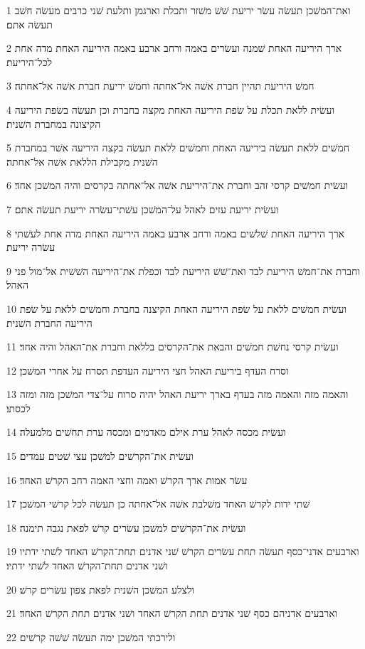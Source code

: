 \par 1 ואת־המשׁכן תעשׂה עשׂר יריעת שׁשׁ משׁזר ותכלת וארגמן ותלעת שׁני כרבים מעשׂה חשׁב תעשׂה אתם׃
\par 2 ארך היריעה האחת שׁמנה ועשׂרים באמה ורחב ארבע באמה היריעה האחת מדה אחת לכל־היריעת׃
\par 3 חמשׁ היריעת תהיין חברת אשׁה אל־אחתה וחמשׁ יריעת חברת אשׁה אל־אחתה׃
\par 4 ועשׂית ללאת תכלת על שׂפת היריעה האחת מקצה בחברת וכן תעשׂה בשׂפת היריעה הקיצונה במחברת השׁנית׃
\par 5 חמשׁים ללאת תעשׂה ביריעה האחת וחמשׁים ללאת תעשׂה בקצה היריעה אשׁר במחברת השׁנית מקבילת הללאת אשׁה אל־אחתה׃
\par 6 ועשׂית חמשׁים קרסי זהב וחברת את־היריעת אשׁה אל־אחתה בקרסים והיה המשׁכן אחד׃
\par 7 ועשׂית יריעת עזים לאהל על־המשׁכן עשׁתי־עשׂרה יריעת תעשׂה אתם׃
\par 8 ארך היריעה האחת שׁלשׁים באמה ורחב ארבע באמה היריעה האחת מדה אחת לעשׁתי עשׂרה יריעת׃
\par 9 וחברת את־חמשׁ היריעת לבד ואת־שׁשׁ היריעת לבד וכפלת את־היריעה השׁשׁית אל־מול פני האהל׃
\par 10 ועשׂית חמשׁים ללאת על שׂפת היריעה האחת הקיצנה בחברת וחמשׁים ללאת על שׂפת היריעה החברת השׁנית׃
\par 11 ועשׂית קרסי נחשׁת חמשׁים והבאת את־הקרסים בללאת וחברת את־האהל והיה אחד׃
\par 12 וסרח העדף ביריעת האהל חצי היריעה העדפת תסרח על אחרי המשׁכן׃
\par 13 והאמה מזה והאמה מזה בעדף בארך יריעת האהל יהיה סרוח על־צדי המשׁכן מזה ומזה לכסתו׃
\par 14 ועשׂית מכסה לאהל ערת אילם מאדמים ומכסה ערת תחשׁים מלמעלה׃
\par 15 ועשׂית את־הקרשׁים למשׁכן עצי שׁטים עמדים׃
\par 16 עשׂר אמות ארך הקרשׁ ואמה וחצי האמה רחב הקרשׁ האחד׃
\par 17 שׁתי ידות לקרשׁ האחד משׁלבת אשׁה אל־אחתה כן תעשׂה לכל קרשׁי המשׁכן׃
\par 18 ועשׂית את־הקרשׁים למשׁכן עשׂרים קרשׁ לפאת נגבה תימנה׃
\par 19 וארבעים אדני־כסף תעשׂה תחת עשׂרים הקרשׁ שׁני אדנים תחת־הקרשׁ האחד לשׁתי ידתיו ושׁני אדנים תחת־הקרשׁ האחד לשׁתי ידתיו׃
\par 20 ולצלע המשׁכן השׁנית לפאת צפון עשׂרים קרשׁ׃
\par 21 וארבעים אדניהם כסף שׁני אדנים תחת הקרשׁ האחד ושׁני אדנים תחת הקרשׁ האחד׃
\par 22 ולירכתי המשׁכן ימה תעשׂה שׁשׁה קרשׁים׃
